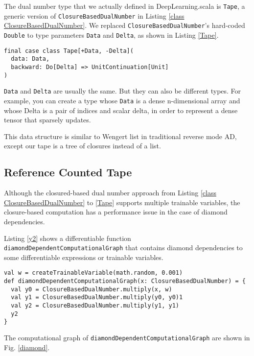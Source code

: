 The dual number type that we actually defined in DeepLearning.scala is \lstinline{Tape}, a generic version of \lstinline{ClosureBasedDualNumber} in Listing \ref{class ClosureBasedDualNumber}. We replaced \lstinline{ClosureBasedDualNumber}'s hard-coded \lstinline{Double} to type parameters \lstinline{Data} and \lstinline{Delta}, as shown in Listing \ref{Tape}.

\begin{lstlisting}[float={htbp},caption={Generic closured-based monadic dual number}, label={Tape}]
final case class Tape[+Data, -Delta](
  data: Data,
  backward: Do[Delta] => UnitContinuation[Unit]
)
\end{lstlisting}

\lstinline{Data} and \lstinline{Delta} are usually the same. But they can also be different types. For example, you can create a type whose \lstinline{Data} is a dense n-dimensional array and whose {Delta} is a pair of indices and scalar delta, in order to represent a dense tensor that sparsely updates.

This data structure is similar to Wengert list in traditional reverse mode AD, except our tape is a tree of closures instead of a list.

\subsection{Reference Counted Tape}

Although the closured-based dual number approach from Listing \ref{class ClosureBasedDualNumber} to \ref{Tape} supports multiple \glspl{trainable variable}, the closure-based computation has a performance issue in the case of diamond dependencies.

Listing \ref{y2} shows a \gls{differentiable function} \lstinline{diamondDependentComputationalGraph} that contains diamond dependencies to some \glspl{differentiable expression} or \glspl{trainable variable}.

\begin{lstlisting}[float={htbp},caption={A diamond dependent \gls{differentiable function}}, label={y2}]
val w = createTrainableVariable(math.random, 0.001)
def diamondDependentComputationalGraph(x: ClosureBasedDualNumber) = {
  val y0 = ClosureBasedDualNumber.multiply(x, w)
  val y1 = ClosureBasedDualNumber.multiply(y0, y0)1
  val y2 = ClosureBasedDualNumber.multiply(y1, y1)
  y2
}
\end{lstlisting}

The \gls{computational graph} of \lstinline{diamondDependentComputationalGraph} are shown in Fig. \ref{diamond}.

